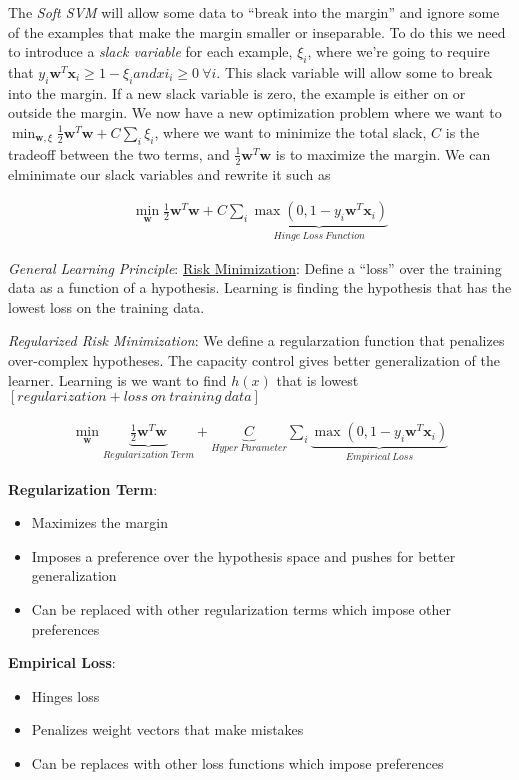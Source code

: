 \documentclass{article}
\begin{document}
The {\em Soft SVM} will allow some data to ``break into the margin'' and ignore some of the examples that make the margin smaller or inseparable. To do this we need to introduce a {\em slack variable} for each example, $\xi_{i}$, where we're going to require that $y_{i}\mathbf{w}^{T}\mathbf{x}_{i}\geq 1-\xi_{i} and xi_{i}\geq 0\ \forall i$. This slack variable will allow some to break into the margin. If a new slack variable is zero, the example is either on or outside the margin. We now have a new optimization problem where we want to $\min_{\mathbf{w},\xi}\frac{1}{2}\mathbf{w}^{T}\mathbf{w}+C\sum_{i}\xi_{i}$, where we want to minimize the total slack, $C$ is the tradeoff between the two terms, and $\frac{1}{2}\mathbf{w}^{T}\mathbf{w}$ is to maximize the margin. We can elminimate our slack variables and rewrite it such as

\begin{align}
\min_{\mathbf{w}}\frac{1}{2}\mathbf{w}^{T}\mathbf{w}+C\sum_{i}\underbrace{\max(0,1-y_{i}\mathbf{w}^{T}\mathbf{x}_{i})}_{Hinge\ Loss\ Function}
\end{align}

{\em General Learning Principle}: \underline{Risk Minimization}: Define a ``loss'' over the training data as a function of a hypothesis. Learning is finding the hypothesis that has the lowest loss on the training data.

{\em Regularized Risk Minimization}: We define a regularzation function that penalizes over-complex hypotheses. The capacity control gives better generalization of the learner. Learning is we want to find $h(x)$ that is lowest $[regularization + loss\ on\ training\ data]$

\begin{align}
\min_{\mathbf{w}}\underbrace{\frac{1}{2}\mathbf{w}^{T}\mathbf{w}}_{Regularization\ Term}+\underbrace{C}_{Hyper\ Parameter}\sum_{i}\underbrace{\max(0,1-y_{i}\mathbf{w}^{T}\mathbf{x}_{i})}_{Empirical\ Loss}
\end{align}

{\bf Regularization Term}:
\begin{itemize}
\item Maximizes the margin
\item Imposes a preference over the hypothesis space and pushes for better generalization
\item Can be replaced with other regularization terms which impose other preferences
\end{itemize}

{\bf Empirical Loss}:
\begin{itemize}
\item Hinges loss
\item Penalizes weight vectors that make mistakes
\item Can be replaces with other loss functions which impose preferences
\end{itemize}
\end{document}
